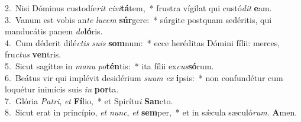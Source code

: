 {2.~}Nisi Dóminus custodíe\textit{rit} \textit{ci}\textit{vi}\textbf{tá}tem,~* frustra vígilat qui custó\textit{dit} \textbf{e}am.\\
{3.~}Vanum est vobis an\textit{te} \textit{lu}\textit{cem} \textbf{súr}gere:~* súrgite postquam sedéritis, qui manducátis panem \textit{do}\textbf{ló}ris.\\
{4.~}Cum déderit dilé\textit{ctis} \textit{su}\textit{is} \textbf{som}num:~* ecce heréditas Dómini fílii: merces, fru\textit{ctus} \textbf{ven}tris.\\
{5.~}Sicut sagíttæ in \textit{ma}\textit{nu} \textit{po}\textbf{tén}tis:~* ita fílii ex\textit{cus}\textbf{só}rum.\\
{6.~}Beátus vir qui implévit desidérium \textit{su}\textit{um} \textit{ex} \textbf{i}psis:~* non confundétur cum loquétur inimícis suis \textit{in} \textbf{por}ta.\\
{7.~}Glória \textit{Pa}\textit{tri}, \textit{et} \textbf{Fí}lio,~* et Spirítu\textit{i} \textbf{San}cto.\\
{8.~}Sicut erat in princípio, \textit{et} \textit{nunc}, \textit{et} \textbf{sem}per,~* et in sǽcula sæculó\textit{rum}. \textbf{A}men.\\
